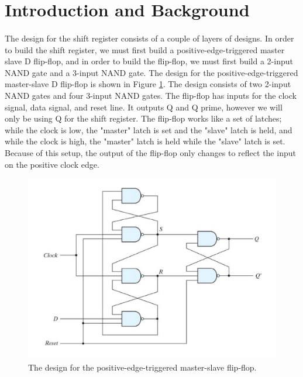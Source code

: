 \documentclass{article}
\begin{document}
\section{Introduction and Background}
  \paragraph{}
  The design for the shift register consists of a couple of layers of designs. In order to build the shift register, we must first build a positive-edge-triggered master slave D flip-flop, and in order to build the flip-flop, we must first build a 2-input NAND gate and a 3-input NAND gate. The design for the positive-edge-triggered master-slave D flip-flop is shown in Figure \ref{fig:ff-design}. The design consists of two 2-input NAND gates and four 3-input NAND gates. The flip-flop has inputs for the clock signal, data signal, and reset line. It outputs Q and Q prime, however we will only be using Q for the shift register. The flip-flop works like a set of latches; while the clock is low, the "master" latch is set and the "slave" latch is held, and while the clock is high, the "master" latch is held while the "slave" latch is set. Because of this setup, the output of the flip-flop only changes to reflect the input on the positive clock edge. 


  \begin{figure}[H]
    \centering
    \includegraphics[width=0.7\linewidth, frame]{images/ff-design.png}
    \caption{The design for the positive-edge-triggered master-slave flip-flop.}
    \label{fig:ff-design}
  \end{figure}
\end{document}
